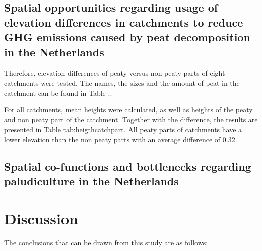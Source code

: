 {\section{Spatial opportunities regarding usage of elevation differences in catchments to reduce GHG emissions caused by peat decomposition in the Netherlands}

Therefore, elevation differences of peaty versus non peaty parts of eight catchments were tested. The names, the sizes and the amount of peat in the catchment can be found in Table ..

For all catchments, mean heights were calculated, as well as heights of the peaty and non peaty part of the catchment. Together with the difference, the results are presented in Table {tab:heigthcatchpart}. All peaty parts of catchments have a lower elevation than the non peaty parts with an average difference of 0.32. 


\section{Spatial co-functions and bottlenecks regarding paludiculture in the Netherlands}



\chapter{Discussion} \label{ch:con}

The conclusions that can be drawn from this study are as follows:

}
